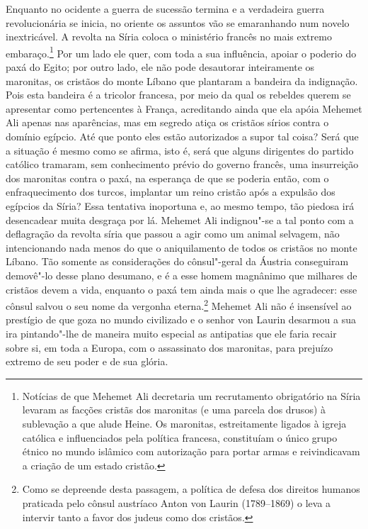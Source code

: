  Enquanto no ocidente a guerra de sucessão termina e a verdadeira guerra
revolucionária se inicia, no oriente os assuntos vão se emaranhando num
novelo inextricável. A revolta na Síria coloca o ministério francês no
mais extremo embaraço.\footnote{ Notícias de que Mehemet Ali decretaria
um recrutamento obrigatório na Síria levaram as facções cristãs dos
maronitas (e uma parcela dos drusos) à sublevação a que alude Heine. Os
maronitas, estreitamente ligados à igreja católica e influenciados pela
política francesa, constituíam o único grupo étnico no mundo islâmico
com autorização para portar armas e reivindicavam a criação de um
estado cristão.} Por um lado ele quer, com toda a sua influência,
apoiar o poderio do paxá do Egito; por outro lado, ele não pode
desautorar inteiramente os maronitas, os cristãos do monte Líbano que
plantaram a bandeira da indignação. Pois esta bandeira é a tricolor
francesa, por meio da qual os rebeldes querem se apresentar como
pertencentes à França, acreditando ainda que ela apóia Mehemet Ali
apenas nas aparências, mas em segredo atiça os cristãos sírios contra o
domínio egípcio. Até que ponto eles estão autorizados a supor tal
coisa? Será que a situação é mesmo como se afirma, isto é, será que
alguns dirigentes do partido católico tramaram, sem conhecimento prévio
do governo francês, uma insurreição dos maronitas contra o paxá, na
esperança de que se poderia então, com o enfraquecimento dos turcos,
implantar um reino cristão após a expulsão dos egípcios da Síria? Essa
tentativa inoportuna e, ao mesmo tempo, tão piedosa irá desencadear
muita desgraça por lá. Mehemet Ali indignou"-se a tal ponto com a
deflagração da revolta síria  que passou a agir como um animal
selvagem, não intencionando nada menos do que o aniquilamento de todos
os cristãos no monte Líbano. Tão somente as considerações do
cônsul"-geral da Áustria conseguiram demovê"-lo desse plano desumano,
e é a esse homem magnânimo que milhares de cristãos devem a vida,
enquanto o paxá tem ainda mais o que lhe agradecer: esse cônsul salvou
o seu nome da vergonha eterna.\footnote{ Como se depreende desta
passagem, a política de defesa dos direitos humanos praticada pelo
cônsul austríaco Anton von Laurin (1789--1869) o leva a intervir
tanto a favor dos judeus como dos cristãos.} Mehemet Ali não é
insensível ao prestígio de que goza no mundo civilizado e o senhor von
Laurin desarmou a sua ira pintando"-lhe de maneira muito especial as
antipatias que ele faria recair sobre si, em toda a Europa, com o
assassinato dos maronitas, para prejuízo extremo de seu poder e de sua
glória.

